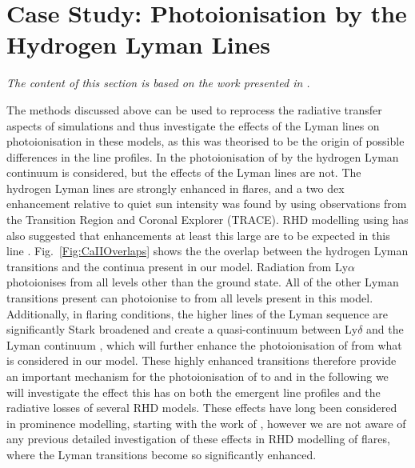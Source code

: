 \section{Case Study: \Caii{} Photoionisation by the Hydrogen Lyman Lines}\label{Sec:CaiiPhotoionisation}

\emph{The content of this section is based on the work presented in \citet{Osborne2021a}.}

The methods discussed above can be used to reprocess the radiative transfer aspects of \Radyn{} simulations and thus investigate the effects of the Lyman lines on \Caii{} photoionisation in these models, as this was theorised to be the origin of possible differences in the \Caii{} line profiles.
In \Radyn{} the photoionisation of \Caii{} by the hydrogen Lyman continuum is considered, but the effects of the Lyman lines are not.
The hydrogen Lyman lines are strongly enhanced in flares, and a two dex enhancement relative to quiet sun intensity was found by \citet{RubioDaCosta2009} using observations from the Transition Region and Coronal Explorer (TRACE).
RHD modelling using \Radyn{} has also suggested that enhancements at least this large are to be expected in this line \citep{Brown2018, Hong2019}.
Fig.~\ref{Fig:CaIIOverlaps} shows the the overlap between the hydrogen Lyman transitions and the \Caii{} continua present in our model.
Radiation from Ly$\alpha$ photoionises \Caii{} from all levels other than the ground state.
All of the other Lyman transitions present can photoionise \Caii{} to \Caiii{} from all levels present in this model.
Additionally, in flaring conditions, the higher lines of the Lyman sequence are significantly Stark broadened and create a quasi-continuum between Ly$\delta$ and the Lyman continuum \citep{DeFeiter1975}, which will further enhance the photoionisation of \Caii{} from what is considered in our model.
These highly enhanced transitions therefore provide an important mechanism for the photoionisation of \Caii{} to \Caiii{} and in the following we will investigate the effect this has on both the emergent line profiles and the radiative losses of several RHD models.
These effects have long been considered in prominence modelling, starting with the work of \citet{Ishizawa1971}, however we are not aware of any previous detailed investigation of these effects in RHD modelling of flares, where the Lyman transitions become so significantly enhanced.

